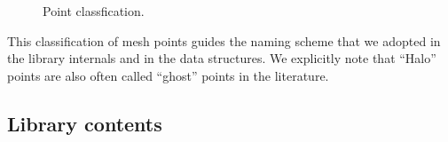 \begin{figure}[h] 
\begin{center}
\leavevmode
{}
\end{center}
\caption{Point classfication.\label{fig:points}}
\end{figure}

This classification of mesh points guides the naming scheme that we
adopted in the library internals and in the data structures. We
explicitly note that ``Halo'' points are also often called ``ghost''
points in the literature. 



\subsection{Library contents}

